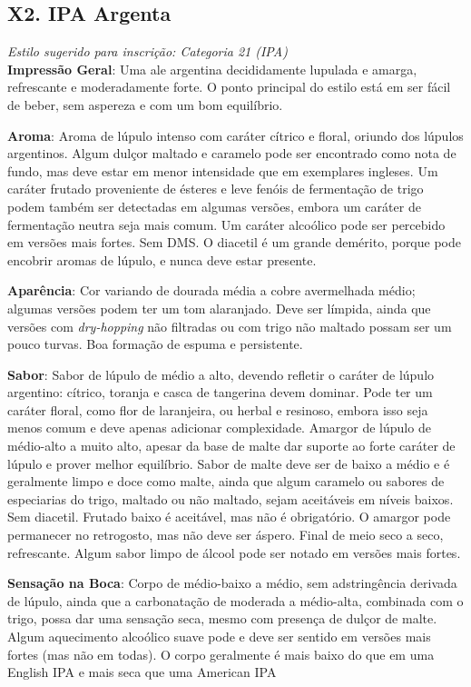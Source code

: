 \subsection*{X2. IPA Argenta}

\textit{Estilo sugerido para inscrição: Categoria 21 (IPA)}\\
\textbf{Impressão Geral}: Uma ale argentina decididamente lupulada e amarga, refrescante e moderadamente forte. O ponto principal do estilo está em ser fácil de beber, sem aspereza e com um bom equilíbrio.

\textbf{Aroma}: Aroma de lúpulo intenso com caráter cítrico e floral, oriundo dos lúpulos argentinos. Algum dulçor maltado e caramelo pode ser encontrado como nota de fundo, mas deve estar em menor intensidade que em exemplares ingleses. Um caráter frutado proveniente de ésteres e leve fenóis de fermentação de trigo podem também ser detectadas em algumas versões, embora um caráter de fermentação neutra seja mais comum. Um caráter alcoólico pode ser percebido em versões mais fortes. Sem DMS. O diacetil é um grande demérito, porque pode encobrir aromas de lúpulo, e nunca deve estar presente.

\textbf{Aparência}: Cor variando de dourada média a cobre avermelhada médio; algumas versões podem ter um tom alaranjado. Deve ser límpida, ainda que versões com \textit{dry-hopping} não filtradas ou com trigo não maltado possam ser um pouco turvas. Boa formação de espuma e persistente.

\textbf{Sabor}: Sabor de lúpulo de médio a alto, devendo refletir o caráter de lúpulo argentino: cítrico, toranja e casca de tangerina devem dominar. Pode ter um caráter floral, como flor de laranjeira, ou herbal e resinoso, embora isso seja menos comum e deve apenas adicionar complexidade. Amargor de lúpulo de médio-alto a muito alto, apesar da base de malte dar suporte ao forte caráter de lúpulo e prover melhor equilíbrio. Sabor de malte deve ser de baixo a médio e é geralmente limpo e doce como malte, ainda que algum caramelo ou sabores de especiarias do trigo, maltado ou não maltado, sejam aceitáveis em níveis baixos. Sem diacetil. Frutado baixo é aceitável, mas não é obrigatório. O amargor pode permanecer no retrogosto, mas não deve ser áspero. Final de meio seco a seco, refrescante. Algum sabor limpo de álcool pode ser notado em versões mais fortes.

\textbf{Sensação na Boca}: Corpo de médio-baixo a médio, sem adstringência derivada de lúpulo, ainda que a carbonatação de moderada a médio-alta, combinada com o trigo, possa dar uma sensação seca, mesmo com presença de dulçor de malte. Algum aquecimento alcoólico suave pode e deve ser sentido em versões mais fortes (mas não em todas). O corpo geralmente é mais baixo do que em uma English IPA e mais seca que uma American IPA

